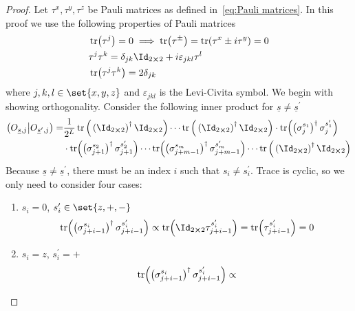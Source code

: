 \begin{proof}
    Let \(\tau^{x},\tau^{y},\tau^{z}\) be Pauli matrices as defined in~\eqref{eq:Pauli matrices}.
    In this proof we use the following properties of Pauli matrices
    \begin{align}
        &\tr(\tau^{j}) = 0 \implies \tr(\tau^{\pm}) = \tr(\tau^x \pm i \tau^y) = 0\label{eq:traceless}\\
        &\tau^{j}\tau^{k} = \delta_{j k} \Id_{2\cross 2} + i \varepsilon_{jkl}
         \tau^{l}\label{eq:product}\\
        &\tr(\tau^{j} \tau^{k}) = 2\delta_{jk}\label{eq:product trace}
    \end{align}
    where \(j,k,l \in \set{x,y,z}\) and \(\varepsilon_{jkl}\) is the Levi-Civita
    symbol.
    We begin with showing orthogonality. Consider the following inner product for 
    \(\underline{s}\neq \underline{s}^{\prime}\)
    \begin{align}
    \hs{O_{\underline{s},j}}{O_{\underline{s}^{\prime},j}} =& \frac{1}{2^L} 
    \tr\Big(\left(\Id_{2\cross 2}\right)^{\dagger}\Id_{2\cross 2}\Big) \cdots 
    \tr\Big(\left(\Id_{2\cross 2}\right)^{\dagger}\Id_{2\cross 2}\Big)
    \cdot \tr(\left(\sigma_j^{s_1}\right)^{\dagger} \sigma_j^{s_1^{\prime}})\nonumber\\ 
    &\cdot \tr(\left(\sigma_{j+1}^{s_2}\right)^{\dagger} \sigma_{j+1}^{s_2^{\prime}})
    \cdots \tr(\left(\sigma_{j+m-1}^{s_m}\right)^{\dagger} \sigma_{j+m-1}^{s_m^{\prime}}) \cdots 
    \tr\Big(\left(\Id_{2\cross 2}\right)^{\dagger}\Id_{2\cross 2}\Big)
    \label{eq:orthogonality proof fragment}
    \end{align}
    Because \(\underline{s}\neq \underline{s}^{\prime}\), there must be an index \(i\) such that
    \(s_i\neq s_i^{\prime}\). Trace is cyclic, so we only need to consider four cases:
    \begin{enumerate}
        \item {\(s_i = 0\), \(s_i^{\prime} \in \set{z,+,-}\)
        \begin{align*}
            \tr(\left(\sigma^{s_i}_{j+i-1}\right)^{\dagger} \sigma^{s_i^{\prime}}_{j+i-1}) \propto
            \tr(\Id_{2\cross 2 }\tau^{s_i^{\prime}}_{j+i-1}) =
            \tr(\tau^{s_i^{\prime}}_{j+i-1})  = 0
        \end{align*}
        }
        \item { \(s_i = z\), \(s_i^{\prime} = +\)
        \begin{align*}
            \tr(\left(\sigma^{s_i}_{j+i-1}\right)^{\dagger} \sigma^{s_i^{\prime}}_{j+i-1}) \propto  

\end{align*}}
\end{enumerate}
\end{proof}
